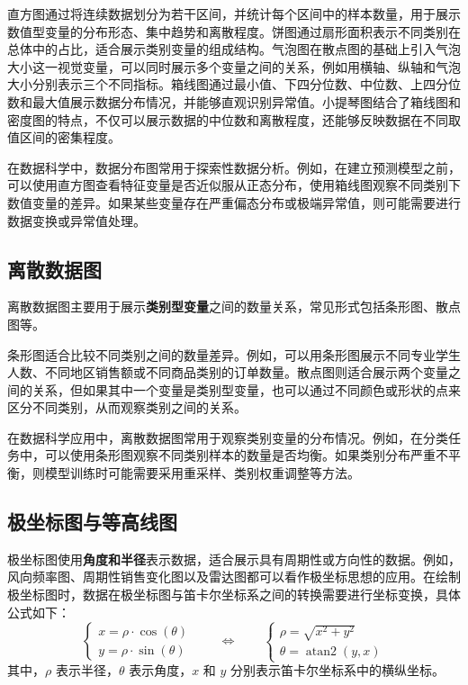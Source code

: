 \documentclass[UTF8,12pt]{ctexart}
\begin{document}
直方图通过将连续数据划分为若干区间，并统计每个区间中的样本数量，用于展示数值型变量的分布形态、集中趋势和离散程度。饼图通过扇形面积表示不同类别在总体中的占比，适合展示类别变量的组成结构。气泡图在散点图的基础上引入气泡大小这一视觉变量，可以同时展示多个变量之间的关系，例如用横轴、纵轴和气泡大小分别表示三个不同指标。箱线图通过最小值、下四分位数、中位数、上四分位数和最大值展示数据分布情况，并能够直观识别异常值。小提琴图结合了箱线图和密度图的特点，不仅可以展示数据的中位数和离散程度，还能够反映数据在不同取值区间的密集程度。

在数据科学中，数据分布图常用于探索性数据分析。例如，在建立预测模型之前，可以使用直方图查看特征变量是否近似服从正态分布，使用箱线图观察不同类别下数值变量的差异。如果某些变量存在严重偏态分布或极端异常值，则可能需要进行数据变换或异常值处理。


\subsection{离散数据图}
离散数据图主要用于展示\textbf{类别型变量}之间的数量关系，常见形式包括条形图、散点图等。

条形图适合比较不同类别之间的数量差异。例如，可以用条形图展示不同专业学生人数、不同地区销售额或不同商品类别的订单数量。散点图则适合展示两个变量之间的关系，但如果其中一个变量是类别型变量，也可以通过不同颜色或形状的点来区分不同类别，从而观察类别之间的关系。

在数据科学应用中，离散数据图常用于观察类别变量的分布情况。例如，在分类任务中，可以使用条形图观察不同类别样本的数量是否均衡。如果类别分布严重不平衡，则模型训练时可能需要采用重采样、类别权重调整等方法。


\subsection{极坐标图与等高线图}
极坐标图使用\textbf{角度和半径}表示数据，适合展示具有周期性或方向性的数据。例如，风向频率图、周期性销售变化图以及雷达图都可以看作极坐标思想的应用。在绘制极坐标图时，数据在极坐标图与笛卡尔坐标系之间的转换需要进行坐标变换，具体公式如下：
\[
\begin{cases}
x = \rho \cdot \cos(\theta) \\[4pt]
y = \rho \cdot \sin(\theta)
\end{cases}
\qquad\Longleftrightarrow\qquad
\begin{cases}
\rho = \sqrt{x^2 + y^2} \\[4pt]
\theta = \operatorname{atan2}(y, x)
\end{cases}
\]
其中，$\rho$ 表示半径，$\theta$ 表示角度，$x$ 和 $y$ 分别表示笛卡尔坐标系中的横纵坐标。
\end{document}
